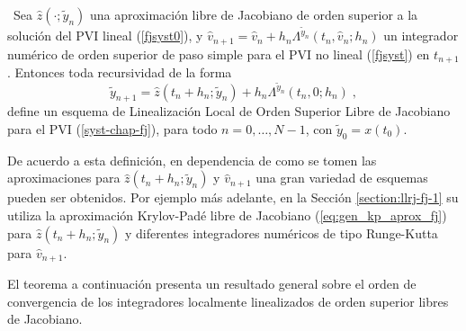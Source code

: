 \begin{definition}\label{definition:holl-fj}
\cite{naranjo2023jacobian}~Sea $\hat{z}(\cdot;\widetilde{y}_n)$ una aproximación libre de Jacobiano de orden superior a la solución del PVI lineal (\ref{fjsyst0}), y $\widehat{v}_ {n+1}=\widehat{v}_n+h_n\Lambda^{\widetilde{y}_n}(t_n,\widehat{v}_n;h_n)$ un integrador numérico de orden superior de paso simple para el PVI no lineal (\ref{fjsyst}) en $t_{n+1}$. Entonces toda recursividad de la forma
\begin{equation*}
    \widetilde{y}_{n+1}= \hat{z}(t_n+h_n;\widetilde{y}_n)+h_n\Lambda^{\widetilde{y}_n}(t_n,0;h_n)\;,
\end{equation*}
define un esquema de Linealización Local de Orden Superior Libre de Jacobiano para el PVI (\ref{syst-chap-fj}), para todo $n=0,\ldots,N-1$, con $\widetilde{y}_0=x(t_0)$.
\end{definition}

De acuerdo a esta definición, en dependencia de como se tomen las aproximaciones para $\hat{z}(t_n+h_n;\widetilde{y}_n)$ y $\widehat{v}_{n+1}$ una gran variedad de esquemas pueden ser obtenidos. Por ejemplo más adelante, en la Sección \ref{section:llrj-fj-1} su utiliza la aproximación Krylov-Padé libre de Jacobiano (\ref{eq:gen_kp_aprox_fj}) para $\hat{z}(t_n+h_n;\widetilde{y}_n)$ y diferentes integradores numéricos de tipo Runge-Kutta para $\widehat{v}_{n+1}$.

El teorema a continuación presenta un resultado general sobre el orden de convergencia de los integradores localmente linealizados de orden superior libres de Jacobiano.

